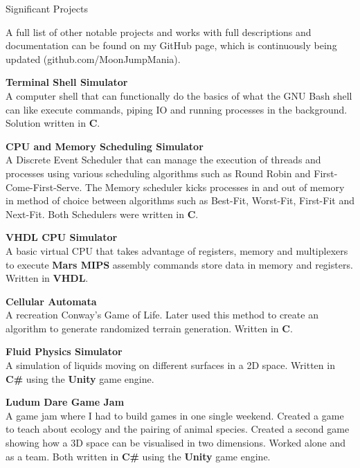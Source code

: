 \documentclass{resume}
\begin{document}
    \begin{rSection}{Significant Projects}

        A full list of other notable projects and works with full descriptions
        and documentation can be found on my GitHub page, which is continuously
        being updated (github.com/MoonJumpMania).

        \textbf{Terminal Shell Simulator}
        \\ A computer shell that can functionally do the basics of what the GNU
        Bash shell can like execute commands, piping IO and running processes in
        the background.
        Solution written in \textbf {C}.

        \textbf{CPU and Memory Scheduling Simulator}
        \\ A Discrete Event Scheduler that can manage the execution of threads
        and processes using various scheduling algorithms such as Round Robin and
        First-Come-First-Serve.
        The Memory scheduler kicks processes in and out of memory in method of
        choice between algorithms such as Best-Fit, Worst-Fit, First-Fit and
        Next-Fit.
        Both Schedulers were written in \textbf {C}.

        \textbf{VHDL CPU Simulator}
        \\ A basic virtual CPU that takes advantage of registers, memory and
        multiplexers to execute \textbf{Mars MIPS} assembly commands store data
        in memory and registers.
        Written in \textbf{VHDL}.

        \textbf{Cellular Automata}
        \\ A recreation Conway's Game of Life.
        Later used this method to create an algorithm to generate randomized
        terrain generation.
        Written in \textbf{C}.

        \textbf{Fluid Physics Simulator}
        \\ A simulation of liquids moving on different surfaces in a 2D space.
        Written in \textbf{C\#} using the \textbf{Unity} game engine.

        \textbf{Ludum Dare Game Jam}
        \\ A game jam where I had to build games in one single weekend.
        Created a game to teach about ecology and the pairing of animal species.
        Created a second game showing how a 3D space can be visualised in two
        dimensions.
        Worked alone and as a team.
        Both written in \textbf{C\#} using the \textbf{Unity} game engine.


\end{rSection}
\end{document}
